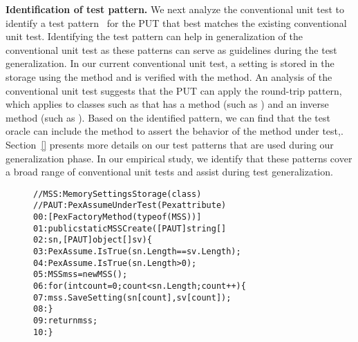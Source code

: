 \textbf{Identification of test pattern.} We next analyze the conventional unit test to identify a test pattern~\cite{PEXDOC} for the PUT that best matches the existing conventional unit test. Identifying the test pattern can help in generalization of the conventional unit test as these patterns can serve as guidelines during the test generalization. In our current conventional unit test, a setting is stored in the storage using the  method and is verified with the  method. An analysis of the conventional unit test suggests that the PUT can apply the round-trip pattern, which applies to classes such as  that has a method (such as ) and an inverse method (such as ). Based on the identified pattern, we can find that the test oracle can include the  method to assert the behavior of the method under test,. Section~\ref{} presents more details on our test patterns that are used during our generalization phase. In our empirical study, we identify that these patterns cover a broad range of conventional unit tests and assist during test generalization.

\begin{figure}[t]
\begin{CodeOut}
\begin{alltt}
//MSS: MemorySettingsStorage (class)
//PAUT: PexAssumeUnderTest	(Pex attribute)
00:[PexFactoryMethod(typeof(MSS))]
01:public static MSS Create([PAUT]string[] 
02:\hspace*{0.3in}sn, [PAUT]object[] sv) \{
03:\hspace*{0.2in}PexAssume.IsTrue(sn.Length == sv.Length);
04:\hspace*{0.2in}PexAssume.IsTrue(sn.Length > 0);
05:\hspace*{0.2in}MSS mss = new MSS();
06:\hspace*{0.2in}for (int count = 0; count < sn.Length; count++) \{
07:\hspace*{0.3in}mss.SaveSetting(sn[count], sv[count]);
08:\hspace*{0.2in}\}
09:\hspace*{0.2in}return mss;            
10:\}
\end{alltt}
\end{CodeOut} 
\end{figure}

